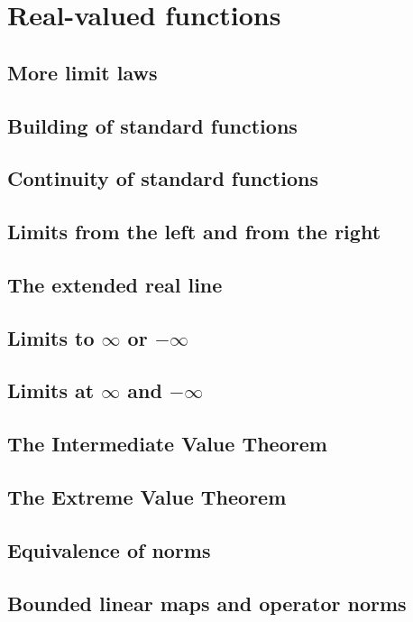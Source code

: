 \section{Real-valued functions}

\subsection{More limit laws}

\subsection{Building of standard functions}

\subsection{Continuity of standard functions}

\subsection{Limits from the left and from the right}

\subsection{The extended real line}

\subsection{Limits to \texorpdfstring{$\infty$}{infinity} or \texorpdfstring{$-\infty$}{minus infinity}}

\subsection{Limits at \texorpdfstring{$\infty$}{infinity} and \texorpdfstring{$-\infty$}{minus infinity}}

\subsection{The Intermediate Value Theorem}

\subsection{The Extreme Value Theorem}

\subsection{Equivalence of norms}

\subsection{Bounded linear maps and operator norms}
